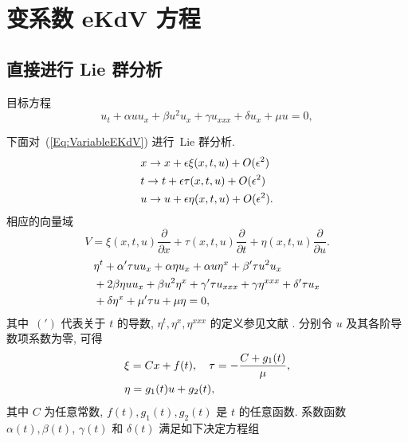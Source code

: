 \section{变系数 eKdV 方程}
\subsection{直接进行 Lie 群分析}
目标方程
\begin{equation}\label{Eq:VariableEKdV}
u_t+\alpha uu_x+\beta u^2u_x+\gamma u_{xxx}+\delta u_x+\mu u=0,
\end{equation}

下面对~(\ref{Eq:VariableEKdV}) 进行~Lie 群分析.
\begin{align}\label{Lie-xtu}
&x\rightarrow x+\epsilon \xi(x,t,u)+O(\epsilon^2)\notag\\
&t\rightarrow t+\epsilon \tau(x,t,u)+O(\epsilon^2)\notag\\
&u\rightarrow u+\epsilon \eta(x,t,u)+O(\epsilon^2).
\end{align}
相应的向量域
\begin{equation}\label{Lie-vector}
V=\xi(x,t,u)\frac{\partial}{\partial x}+\tau(x,t,u)\frac{\partial}{\partial t}+\eta(x,t,u)\frac{\partial}{\partial u}.
\end{equation}
\begin{align}\label{Lie-eKdV}
&\eta^t+\alpha'\tau uu_x+\alpha\eta u_x+\alpha u\eta^x+\beta'\tau u^2u_x\notag\\
&+2\beta\eta uu_x+\beta u^2\eta^x+\gamma'\tau u_{xxx}+\gamma \eta^{xxx}+\delta'\tau u_x\notag\\
&+\delta \eta^x+\mu'\tau u+\mu\eta=0,
\end{align}
其中~$(')$ 代表关于 $t$ 的导数, $\eta^t, \eta^x, \eta^{xxx}$ 的定义参见文献 \cite{Olver1993}.
分别令 $u$ 及其各阶导数项系数为零, 可得
\begin{align}
&\xi=C x+f(t),\quad \tau=-\frac{C+g_1(t)}{\mu},\notag\\
&\eta=g_1(t)u+g_2(t),
\end{align}
其中 $C$ 为任意常数, $f(t), g_1(t), g_2(t)$ 是 $t$ 的任意函数. 系数函数 $\alpha(t), \beta(t)$, $\gamma(t)$ 和 $\delta(t)$ 满足如下决定方程组
